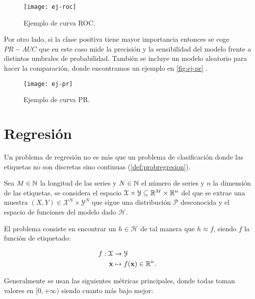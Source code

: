 \begin{figure}[htpb]
  \centering
  \texttt{[image: ej-roc]}
  \caption{Ejemplo de curva ROC.}
  \label{fig:ej-roc}
\end{figure}

Por otro lado, si la clase positiva tiene mayor importancia entonces se coge $PR-AUC$ que en este caso mide la precisión y la sensibilidad del modelo frente a distintos umbrales de probabilidad. También se incluye un modelo aleatorio para hacer la comparación, donde encontramos un ejemplo en \autoref{fig:ej-pr} \cite{scikit2020pr}.

\begin{figure}[htpb]
  \centering
  \texttt{[image: ej-pr]}
  \caption{Ejemplo de curva PR.}
  \label{fig:ej-pr}
\end{figure}

\section{Regresión}

Un problema de regresión no es más que un problema de clasificación donde las etiquetas no son discretas sino continuas (\autoref{def:probregresion}).

\begin{definicion}
  Sea $M \in \mathbb{N}$ la longitud de las series y $N \in \mathbb{N}$ el número de series y $n$ la dimensión de las etiquetas, se considera el espacio $\mathcal{X} \times \mathcal{Y} \subseteq \mathbb{R}^M \times \mathbb{R}^n$ del que se extrae una muestra $(X, Y) \in \mathcal{X}^N \times \mathcal{Y}^N$ que sigue una distribución $\mathcal{P}$ desconocida y el espacio de funciones del modelo dado $\mathcal{H}$.

  El problema consiste en encontrar un $h \in \mathcal{H}$ de tal manera que $h \approx f$, siendo $f$ la función de etiquetado:

  \begin{align*}
    f : \mathcal{X} & \to \mathcal{Y} \\
    \textbf{x} & \mapsto f(\textbf{x}) \in \mathbb{R}^n.
  \end{align*}
  \label{def:probregresion}
\end{definicion}

Generalmente se usan las siguientes métricas principales, donde todas toman valores en $[0, +\infty)$ siendo cuanto más bajo mejor:

